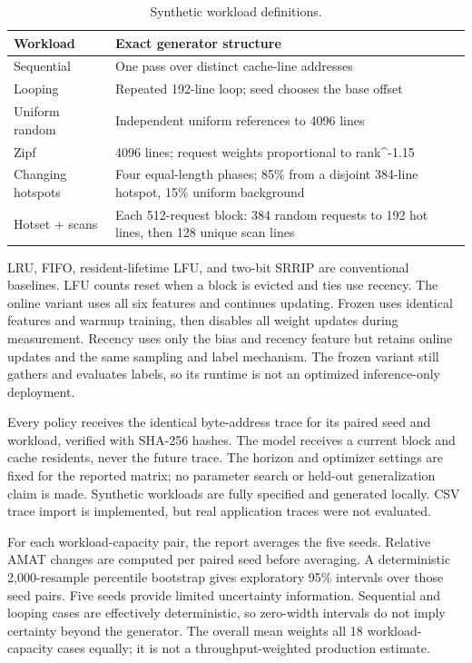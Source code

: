 \documentclass[10pt,a4paper]{article}
\begin{document}
\begin{table}[htbp]\centering\small
\caption{Synthetic workload definitions.}
\begin{tabularx}{\linewidth}{XX}
\toprule
Workload & Exact generator structure \\
\midrule
Sequential & One pass over distinct cache-line addresses \\
Looping & Repeated 192-line loop; seed chooses the base offset \\
Uniform random & Independent uniform references to 4096 lines \\
Zipf & 4096 lines; request weights proportional to rank\textasciicircum{}-1.15 \\
Changing hotspots & Four equal-length phases; 85\% from a disjoint 384-line hotspot, 15\% uniform background \\
Hotset + scans & Each 512-request block: 384 random requests to 192 hot lines, then 128 unique scan lines \\
\bottomrule
\end{tabularx}\end{table}
LRU, FIFO, resident-lifetime LFU, and two-bit SRRIP are conventional baselines. LFU counts reset when a block is evicted and ties use recency. The online variant uses all six features and continues updating. Frozen uses identical features and warmup training, then disables all weight updates during measurement. Recency uses only the bias and recency feature but retains online updates and the same sampling and label mechanism. The frozen variant still gathers and evaluates labels, so its runtime is not an optimized inference-only deployment.

Every policy receives the identical byte-address trace for its paired seed and workload, verified with SHA-256 hashes. The model receives a current block and cache residents, never the future trace. The horizon and optimizer settings are fixed for the reported matrix; no parameter search or held-out generalization claim is made. Synthetic workloads are fully specified and generated locally. CSV trace import is implemented, but real application traces were not evaluated.

For each workload-capacity pair, the report averages the five seeds. Relative AMAT changes are computed per paired seed before averaging. A deterministic 2,000-resample percentile bootstrap gives exploratory 95\% intervals over those seed pairs. Five seeds provide limited uncertainty information. Sequential and looping cases are effectively deterministic, so zero-width intervals do not imply certainty beyond the generator. The overall mean weights all 18 workload-capacity cases equally; it is not a throughput-weighted production estimate.
\end{document}
